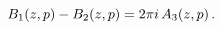 \[\mathop{B_{1}\/}\nolimits\!\left(z,p\right)-\mathop{B_{2}\/}\nolimits\!\left(z%
,p\right)=2\pi i\mathop{A_{3}\/}\nolimits\!\left(z,p\right).\]